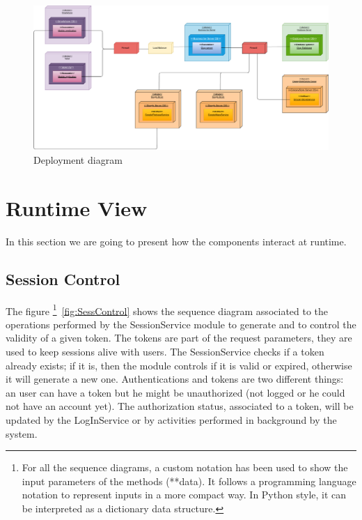 \begin{figure}[H]
    \centering
    \includegraphics[width=1.0\textwidth]{images/deployment_view.pdf}
    \caption{Deployment diagram}\label{fig:Deployment diagram}
\end{figure}


\section{Runtime View}

In this section we are going to present how the components interact at runtime.

\subsection{Session Control}

The figure \footnote{For all the sequence diagrams, a custom notation has been used to show the input parameters of the methods (**data). It follows a programming language notation to represent inputs in a more compact way. In Python style, it can be interpreted as a dictionary data structure.}~\ref{fig:SessControl} shows the sequence diagram associated to the operations performed by the SessionService module to generate and to control the validity of a given token. The tokens are part of the request parameters, they are used to keep sessions alive with users. The SessionService checks if a token already exists; if it is, then the module controls if it is valid or expired, otherwise it will generate a new one.
Authentications and tokens are two different things: an user can have a token but he might be unauthorized (not logged or he could not have an account yet). The authorization status, associated to a token, will be updated by the LogInService or by activities performed in background by the system.

